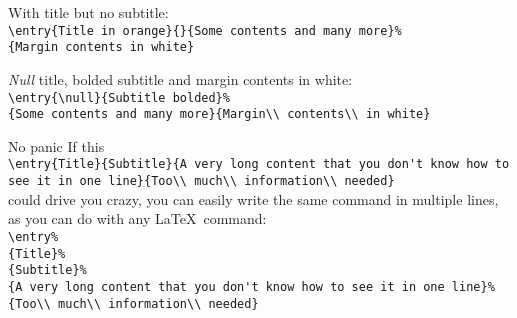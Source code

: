\documentclass[english]{michael-cv}
\begin{document}
\vfill
\begin{para}{}
With title but no subtitle:\\
\verb+\entry{Title in orange}{}{Some contents and many more}%+\\\verb+{Margin contents in white}+\\
\end{para}
\vfill
\begin{para}{}
\emph{Null} title, bolded subtitle and margin contents in white:\\
\verb+\entry{\null}{Subtitle bolded}%+\\\verb+{Some contents and many more}{Margin\\ contents\\ in white}+\\
\end{para}

\newpage
\begin{para}{No panic}
If this\\
\null\hspace{4ex}\verb+\entry{Title}{Subtitle}{A very long content that you don't know how to see it in one line}{Too\\ much\\ information\\ needed}+\\[1ex]
could drive you crazy, you can easily write the same command in multiple lines, as you can do with any \LaTeX\ command:\\
\null\hspace{4ex}\verb+\entry%+\\[-2ex]
\null\hspace{4ex}\verb+{Title}%+\\[-2ex]
\null\hspace{4ex}\verb+{Subtitle}%+\\[-2ex]
\null\hspace{4ex}\verb+{A very long content that you don't know how to see it in one line}%+\\[-2ex]
\null\hspace{4ex}\verb+{Too\\ much\\ information\\ needed}+\\
\end{para}
\end{document}
